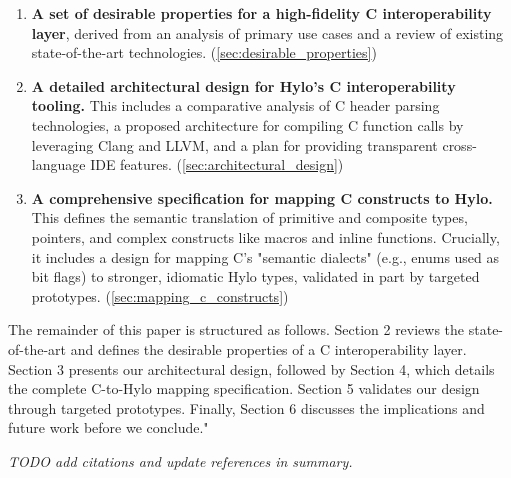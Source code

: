 \begin{enumerate}
    \item \textbf{A set of desirable properties for a high-fidelity C interoperability layer}, derived from an analysis of primary use cases and a review of existing state-of-the-art technologies. (\autoref{sec:desirable_properties})   
    \item \textbf{A detailed architectural design for Hylo's C interoperability tooling.} This includes a comparative analysis of C header parsing technologies, a proposed architecture for compiling C function calls by leveraging Clang and LLVM, and a plan for providing transparent cross-language IDE features. (\autoref{sec:architectural_design})
    \item \textbf{A comprehensive specification for mapping C constructs to Hylo.} This defines the semantic translation of primitive and composite types, pointers, and complex constructs like macros and inline functions. Crucially, it includes a design for mapping C's "semantic dialects" (e.g., enums used as bit flags) to stronger, idiomatic Hylo types, validated in part by targeted prototypes. (\autoref{sec:mapping_c_constructs})
\end{enumerate}


The remainder of this paper is structured as follows. Section 2 reviews the state-of-the-art and defines the desirable properties of a C interoperability layer. Section 3 presents our architectural design, followed by Section 4, which details the complete C-to-Hylo mapping specification. Section 5 validates our design through targeted prototypes. Finally, Section 6 discusses the implications and future work before we conclude."

\textit{TODO add citations and update references in summary.} 
    
    
    
    
